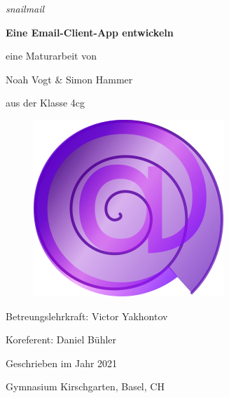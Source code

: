 \documentclass[a4paper,11pt]{article}
\begin{document}
\begin{titlepage}

	\centering
	
    \vspace{5cm}
    {\slshape\large snailmail \par}
    \vspace{0.1cm}
	{\huge\bfseries Eine Email-Client-App entwickeln \par}
	\vspace{0.5cm}
	{\Large eine Maturarbeit von \par}
	{\Large Noah Vogt \& Simon Hammer \par}
    {\Large aus der Klasse 4cg \par}
    \vspace{0.5cm}
   
    \begin{figure}[H]
        \centering
        \includegraphics[width=.7\textwidth]{../logo/version3d.png}
    \end{figure}
   
    \vspace{0.5cm}
    {\Large Betreungslehrkraft: Victor Yakhontov \par }
    {\Large Koreferent: Daniel Bühler \par}
    \vspace{0.5cm}
	{\large Geschrieben im Jahr 2021 \par}
    {\large Gymnasium Kirschgarten, Basel, CH \par}
	
\end{titlepage}
\end{document}
